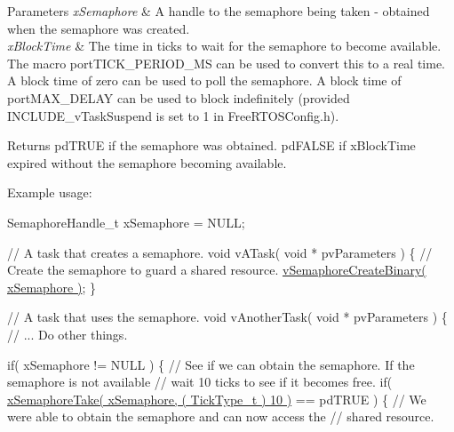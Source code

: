 \begin{DoxyParams}{Parameters}
{\em x\+Semaphore} & A handle to the semaphore being taken -\/ obtained when the semaphore was created.\\
\hline
{\em x\+Block\+Time} & The time in ticks to wait for the semaphore to become available. The macro port\+T\+I\+C\+K\+\_\+\+P\+E\+R\+I\+O\+D\+\_\+\+MS can be used to convert this to a real time. A block time of zero can be used to poll the semaphore. A block time of port\+M\+A\+X\+\_\+\+D\+E\+L\+AY can be used to block indefinitely (provided I\+N\+C\+L\+U\+D\+E\+\_\+v\+Task\+Suspend is set to 1 in Free\+R\+T\+O\+S\+Config.\+h).\\
\hline
\end{DoxyParams}
\begin{DoxyReturn}{Returns}
pd\+T\+R\+UE if the semaphore was obtained. pd\+F\+A\+L\+SE if x\+Block\+Time expired without the semaphore becoming available.
\end{DoxyReturn}
Example usage\+: 
\begin{DoxyPre}
SemaphoreHandle\_t xSemaphore = NULL;\end{DoxyPre}



\begin{DoxyPre}// A task that creates a semaphore.
void vATask( void * pvParameters )
\{
   // Create the semaphore to guard a shared resource.
   \hyperlink{vendor_2ceedling_2plugins_2freertos_2src_2freertos_2include_2semphr_8h_ae10bffadd26fbd5bcce76bf33a83ef30}{vSemaphoreCreateBinary( xSemaphore )};
\}\end{DoxyPre}



\begin{DoxyPre}// A task that uses the semaphore.
void vAnotherTask( void * pvParameters )
\{
   // ... Do other things.\end{DoxyPre}



\begin{DoxyPre}   if( xSemaphore != NULL )
   \{
       // See if we can obtain the semaphore.  If the semaphore is not available
       // wait 10 ticks to see if it becomes free.
       if( \hyperlink{vendor_2ceedling_2plugins_2freertos_2src_2freertos_2include_2semphr_8h_af116e436d2a5ae5bd72dbade2b5ea930}{xSemaphoreTake( xSemaphore, ( TickType\_t ) 10 )} == pdTRUE )
       \{
           // We were able to obtain the semaphore and can now access the
           // shared resource.\end{DoxyPre}



